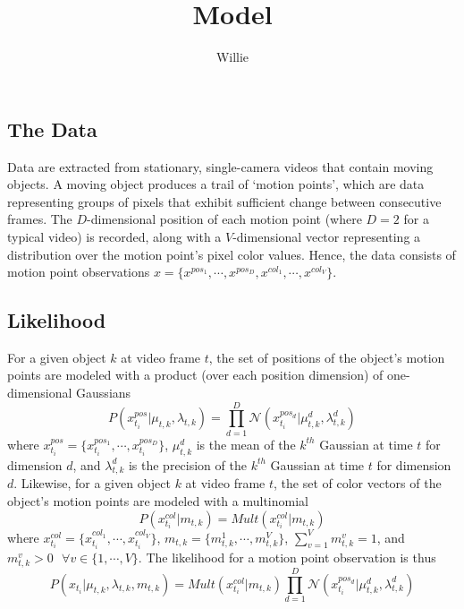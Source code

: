 \documentclass{article}
\begin{document}
\title{Model}
\author{Willie}
\maketitle
\mbox{}







\subsection*{The Data}
Data are extracted from stationary, single-camera videos that contain moving objects. A moving object produces a trail of `motion points', which are data representing groups of pixels that exhibit sufficient change between consecutive frames. The $D$-dimensional position of each motion point (where $D=2$ for a typical video) is recorded, along with a $V$-dimensional vector representing a distribution over the motion point's pixel color values. Hence, the data consists of motion point observations $x = \{ x^{pos_{1}}, \cdots, x^{pos_{D}}, x^{col_{1}}, \cdots, x^{col_{V}} \}$.


\subsection*{Likelihood}
For a given object $k$ at video frame $t$, the set of positions of the object's motion points are modeled with a product (over each position dimension) of one-dimensional Gaussians
\begin{equation}
P(x_{t_{i}}^{pos} | \mu_{t, k}, \lambda_{t, k}) = \prod_{d=1}^{D} \mathcal{N}(x_{t_{i}}^{pos_{d}} | \mu_{t, k}^{d}, \lambda_{t, k}^{d})
\end{equation}
where $x_{t_{i}}^{pos} = \{ x_{t_{i}}^{pos_{1}}, \cdots, x_{t_{i}}^{pos_{D}} \}$,  $\mu_{t, k}^{d}$ is the mean of the $k^{th}$ Gaussian at time $t$ for dimension $d$, and $\lambda_{t, k}^{d}$ is the precision of the $k^{th}$ Gaussian at time $t$ for dimension $d$.  Likewise, for a given object $k$ at video frame $t$, the set of color vectors of the object's motion points are modeled with a multinomial
\begin{equation}
P(x_{t_{i}}^{col} | m_{t, k}) = Mult(x_{t_{i}}^{col} | m_{t, k})
\end{equation}
where $x_{t_{i}}^{col} = \{ x_{t_{i}}^{col_{1}}, \cdots, x_{t_{i}}^{col_{V}} \}$, $m_{t,k} = \{ m_{t,k}^{1}, \cdots, m_{t,k}^{V} \}$, $\sum_{v=1}^{V} m_{t, k}^{v} = 1$, and $m_{t,k}^{v}>0 \hspace{8pt} \forall v \in \{ 1, \cdots, V \}$. The likelihood for a motion point observation is thus
\begin{equation}
P(x_{t_{i}} | \mu_{t, k}, \lambda_{t, k}, m_{t, k}) =  Mult(x_{t_{i}}^{col} | m_{t, k})   \prod_{d=1}^{D}  \mathcal{N}(x_{t_{i}}^{pos_{d}} | \mu_{t, k}^{d}, \lambda_{t, k}^{d}) 
\end{equation}
\end{document}
